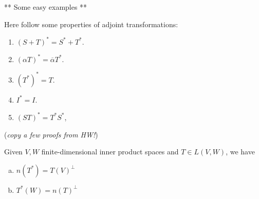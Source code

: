 ** Some easy examples **

Here follow some properties of adjoint transformations:
\begin{enumerate}[(1)]
  \item $(S+T)^*=S^*+T^*$.
  \item $(\alpha T)^* = \overline{\alpha}T^*$.
  \item $(T^*)^*=T$.
  \item $I^*=I$.
  \item $(ST)^* = T^*S^*$,
\end{enumerate}

(\emph{copy a few proofs from HW!})



\begin{theorem}
  Given $V,W$ finite-dimensional inner product spaces and $T\in L(V,W)$, we have
  \begin{enumerate}[(a)]
    \item $n(T^*) = T(V)^\perp$
    \item $T^*(W) = n(T)^\perp$
  \end{enumerate}
\end{theorem}

